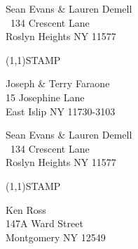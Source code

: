 \documentclass[12pt]{article}
\begin{document}
\begin{minipage}{.5\linewidth} \noindent
Sean Evans \& Lauren Demell\\\ 
134 Crescent Lane\\ 
Roslyn Heights NY 11577
\end{minipage}
\begin{minipage}{.5\linewidth \hspace{-.2in} \vspace{-.3in}}
\begin{flushright}
\framebox(1,1){STAMP}
\end{flushright}
\end{minipage}

\begin{center} \begin{Huge} \vspace*{\fill}
Joseph \& Terry Faraone\\
15 Josephine Lane\\
East Islip NY 11730-3103\\
\vspace{\fill} \end{Huge} \end{center}

\clearpage

\begin{minipage}{.5\linewidth} \noindent
Sean Evans \& Lauren Demell\\\ 
134 Crescent Lane\\ 
Roslyn Heights NY 11577
\end{minipage}
\begin{minipage}{.5\linewidth \hspace{-.2in} \vspace{-.3in}}
\begin{flushright}
\framebox(1,1){STAMP}
\end{flushright}
\end{minipage}

\begin{center} \begin{Huge} \vspace*{\fill}
Ken Ross\\
147A Ward Street\\
Montgomery NY 12549\\
\vspace{\fill} \end{Huge} \end{center}

\clearpage
\end{document}
